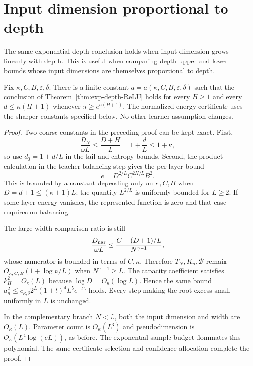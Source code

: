 \section{Input dimension proportional to depth}
The same exponential-depth conclusion holds when input dimension grows linearly with depth. This is useful when comparing depth upper and lower bounds whose input dimensions are themselves proportional to depth.

\begin{theorem}[A uniform bound for $d=O(H)$]
\label{thm:linear-dimension-depth}
Fix $\kappa,C,B,\varepsilon,\delta$. There is a finite constant
$a=a(\kappa,C,B,\varepsilon,\delta)$ such that the conclusion of Theorem~\ref{thm:exp-depth-ReLU} holds for every $H\ge1$ and every
$d\le\kappa(H+1)$ whenever $n\ge e^{a(H+1)}$.
The normalized-energy certificate uses the sharper constants specified below. No other learner assumption changes.
\end{theorem}
\begin{proof}
Two coarse constants in the preceding proof can be kept exact. First,
\[
 \frac{D_N}{\omega L}\le\frac{D+H}{L}
       =1+\frac dL\le1+\kappa,
\]
so use $d_0=1+d/L$ in the tail and entropy bounds.
Second, the product calculation in the teacher-balancing step gives the per-layer bound
\[
 e=D^{2/L}C^{2H/L}B^2.
\]
This is bounded by a constant depending only on $\kappa,C,B$ when
$D=d+1\le(\kappa+1)L$: the quantity $L^{2/L}$ is uniformly bounded for $L\ge2$. If some layer energy vanishes, the represented function is zero and that case requires no balancing.

The large-width comparison ratio is still
\[
 \frac{D_{\rm nar}}{\omega L}
 \le\frac{C+(D+1)/L}{N^{\gamma-1}},
\]
whose numerator is bounded in terms of $C,\kappa$. Therefore
$T_N,K_n,\mathcal B$ remain $O_{\kappa,C,B}(1+\log n/L)$ when
$N^{\gamma-1}\ge L$.
The capacity coefficient satisfies $k_H^2=O_\kappa(L)$ because
$\log D=O_\kappa(\log L)$. Hence the same bound
$a_n^2\le c_{\kappa,\delta}2^L(1+t)^4L^5e^{-tL}$ holds.
Every step making the root excess small uniformly in $L$ is unchanged.

In the complementary branch $N<L$, both the input dimension and width are $O_\kappa(L)$. Parameter count is $O_\kappa(L^3)$ and pseudodimension is $O_\kappa(L^4\log(eL))$, as before. The exponential sample budget dominates this polynomial. The same certificate selection and confidence allocation complete the proof.
\end{proof}
